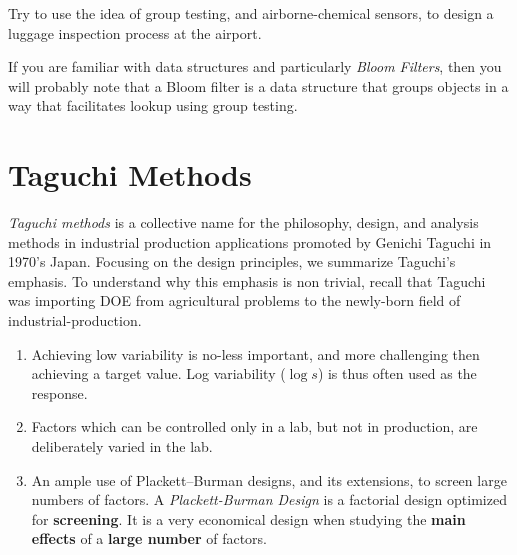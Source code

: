 \begin{think}
	Try to use the idea of group testing, and airborne-chemical sensors, to design a luggage inspection process at the airport. 
\end{think}


\begin{extra}
If you are familiar with data structures and particularly \emph{Bloom Filters}, then you will probably note that a Bloom filter is a data structure that groups objects in a way that facilitates lookup using group testing. 
\end{extra}











\section{Taguchi Methods}

\emph{Taguchi methods} is a collective name for the philosophy, design, and analysis methods in industrial production applications promoted by Genichi Taguchi in 1970's Japan.
Focusing on the design principles, we summarize Taguchi's emphasis. 
To understand why this emphasis is non trivial, recall that Taguchi was importing DOE from agricultural problems to the newly-born field of industrial-production.

\begin{enumerate}
	
	\item Achieving low variability is no-less important, and more challenging then achieving a target value. 
	Log variability ($\log s$) is thus often used as the response.
	
	\item Factors which can be controlled only in a lab, but not in production, are deliberately varied in the lab. 
	
	\item An ample use of Plackett–Burman designs, and its extensions, to screen large numbers of factors. 
	A \emph{Plackett-Burman Design} is a factorial design optimized for \textbf{screening}. 
	It is a very economical design when studying the \textbf{main effects} of a \textbf{large number} of factors. 
	
	
\end{enumerate}


